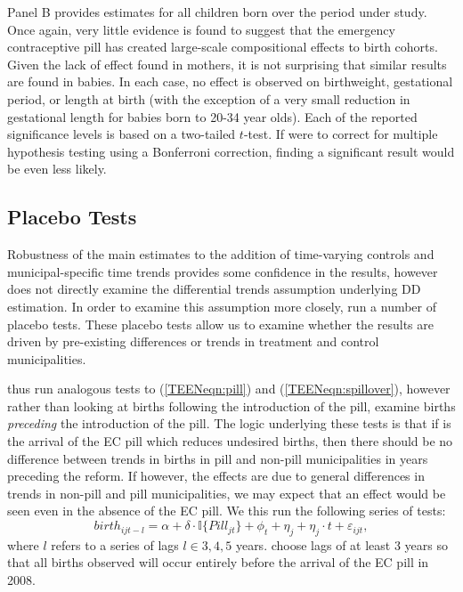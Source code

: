 Panel B provides estimates for all children born over the period under study.
Once again, very little evidence is found to suggest that the emergency 
contraceptive pill has created large-scale compositional effects to birth
cohorts.  Given the lack of effect found in mothers, it is not surprising
that similar results are found in babies.  In each case, no effect is observed
on birthweight, gestational period, or length at birth (with the exception
of a very small reduction in gestational length for babies born to 20-34 year
olds).  Each of the reported significance levels is based on a two-tailed 
$t$-test.  If \person were to correct for multiple hypothesis testing using a
Bonferroni correction, finding a significant result would be even less likely.

\subsection{Placebo Tests}
\label{TEENsscn:placebo}
Robustness of the main estimates to the addition of time-varying controls and
municipal-specific time trends provides some confidence in the results, however 
does not directly examine the differential trends assumption underlying 
DD estimation.  In order to examine this assumption more closely, 
\person run a number of placebo tests.  These placebo tests allow us to examine
whether the results are driven by pre-existing differences or trends in treatment
and control municipalities. 

\Person thus run analogous tests to (\ref{TEENeqn:pill}) and 
(\ref{TEENeqn:spillover}), however rather than looking at births following the
introduction of the pill, \person examine births \emph{preceding} the introduction
of the pill.  The logic underlying these tests is that if is the arrival of the EC 
pill which reduces undesired births, then there should be no difference between 
trends in births in pill and non-pill municipalities in years preceding the reform.  
If however, the effects are due to general differences in trends in non-pill and 
pill municipalities, we may expect that an effect would be seen even in the 
absence of the EC pill.  We this run the following series of tests:
\begin{equation}
 \label{TEENeqn:placebo}
birth_{ijt-l} = \alpha + \delta\cdot \mathbb{I}\{Pill_{jt}\} + \phi_t + \eta_j + 
\eta_j\cdot t + \varepsilon_{ijt},
\end{equation}
where $l$ refers to a series of lags $l\in 3,4,5$ years.  \Person choose lags of
at least 3 years so that all births observed will occur entirely before the 
arrival of the EC pill in 2008.

